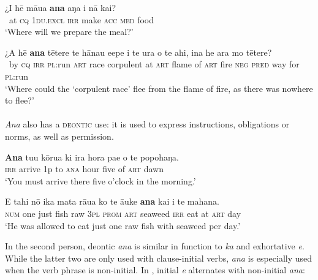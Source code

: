 \ea\label{ex:11.171}
\gll ¿{\ꞌ}I hē māua \textbf{ana} aŋa i nā kai? \\
~at \textsc{cq} \textsc{1du.excl} \textsc{irr} make \textsc{acc} \textsc{med} food \\

\glt 
‘Where will we prepare the meal?’ \textstyleExampleref{[Luke 22:9]}
\z

\ea\label{ex:11.172}
\gll ¿A hē \textbf{ana} tētere te hānau {\ꞌ}e{\ꞌ}epe {\ꞌ}i te ura o te ahi,  {\ꞌ}ina he ara mo tētere?\\
~by \textsc{cq} \textsc{irr} \textsc{pl}:run \textsc{art} race corpulent at \textsc{art} flame of \textsc{art} fire  \textsc{neg} \textsc{pred} way for \textsc{pl}:run\\

\glt 
‘Where could the ‘corpulent race’ flee from the flame of fire, as there was nowhere to flee?’ \textstyleExampleref{[Mtx-3-02.034]}
\z

\paragraph{} \textit{Ana} also has a \textsc{deontic} use: it is used to express instructions, obligations or norms, as well as permission.

\ea\label{ex:11.173}
\gll \textbf{Ana} tu{\ꞌ}u kōrua ki ira hora pae o te popohaŋa. \\
\textsc{irr} arrive 1p to \textsc{ana} hour five of \textsc{art} dawn \\

\glt 
‘You must arrive there five o’clock in the morning.’ \textstyleExampleref{[R310.272]} 
\z

\ea\label{ex:11.174}
\gll E tahi nō ika mata rāua ko te {\ꞌ}āuke \textbf{ana} kai {\ꞌ}i te mahana. \\
\textsc{num} one just fish raw \textsc{3pl} \textsc{prom} \textsc{art} seaweed \textsc{irr} eat at \textsc{art} day \\

\glt
‘He was allowed to eat just one raw fish with seaweed per day.’ \textstyleExampleref{[Fel-40.11]}
\z

In the second person, deontic \textit{ana} is similar in function to  \textit{ka} and exhortative \textit{e}. While the latter two are only used with clause-initial verbs, \textit{ana} is especially used when the verb phrase is non-initial. In , initial \textit{e} alternates with non-initial \textit{ana}:


